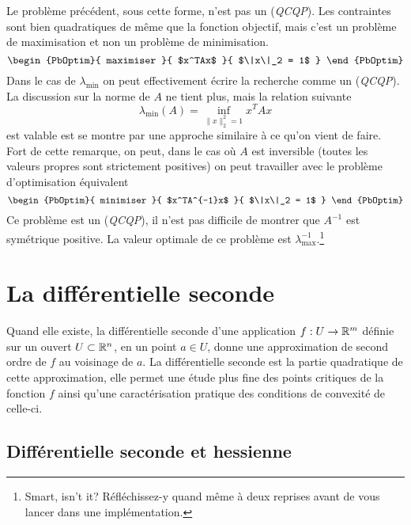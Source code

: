 \documentclass[11pt, a4paper]{article}
\begin{document}
\begin{solution}
  Le problème précédent, sous cette forme, n'est pas un
  (\emph{QCQP}). Les contraintes sont bien quadratiques de même que la
  fonction objectif, mais c'est un problème de maximisation et non un
  problème de minimisation. 
  \[
  \begin{PbOptim}{
      maximiser 
    }{
      $x^TAx$ 
    }{ 
      $\|x\|_2 = 1$ 
    }
  \end{PbOptim}
  \]  
  Dans le cas de $\lambda_{\text{min}}$ on
  peut effectivement écrire la recherche comme un (\emph{QCQP}). La
  discussion sur la norme de $A$ ne tient plus, mais la relation
  suivante
  \[
  \lambda_{\text{min}}(A) = \inf_{\|x\|_2^2 = 1} x^TAx
  \]
  est valable est se montre par une approche similaire à ce qu'on
  vient de faire. Fort de cette remarque, on peut, dans le cas où $A$
  est inversible (toutes les valeurs propres sont strictement
  positives) on peut travailler avec le problème d'optimisation
  équivalent
  \[
  \begin{PbOptim}{
      minimiser 
    }{
      $x^TA^{-1}x$ 
    }{ 
      $\|x\|_2 = 1$ 
    }
  \end{PbOptim}
  \]  
  Ce problème est un (\emph{QCQP}), il n'est pas difficile de montrer
  que $A^{-1}$ est symétrique positive. La valeur optimale de ce
  problème est $\lambda_{\text{max}}^{-1}$.\footnote{Smart, isn't it?
    Réfléchissez-y quand même à deux reprises avant de vous lancer
    dans une implémentation.}
\end{solution}


\section{La différentielle seconde}
\label{sec:diff2}

Quand elle existe, la différentielle seconde d'une application
$f : U \to \mathbb{R}^m$ définie sur un ouvert $U \subset \mathbb{R}^n$, en un point
$a \in U$, donne une approximation de second ordre de $f$ au voisinage
de $a$. La différentielle seconde est la partie quadratique de cette
approximation, elle permet une étude plus fine des points critiques de
la fonction $f$ ainsi qu'une caractérisation pratique des conditions
de convexité de celle-ci.

\subsection{Différentielle seconde et hessienne}
\end{document}

